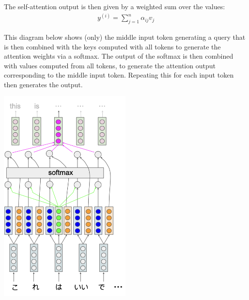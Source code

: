 The self-attention output is then given by a weighted sum over the values:
\begin{eqnarray}
  {y}^{(i)} = \sum_{j=1}^n  \alpha_{ij} v_{j}
\label{eq:self_attention_output}
\end{eqnarray}

This diagram below shows (only) the middle input token generating a query that is then combined with the keys computed with all tokens to generate the attention weights via a softmax. The output of the softmax is then combined with values computed from all tokens, to generate the attention output corresponding to the middle input token. Repeating this for each input token then generates the output.


\begin{center}
  \includegraphics[width=2.615in]{figures/transformer-self-attention.png}
\end{center}



